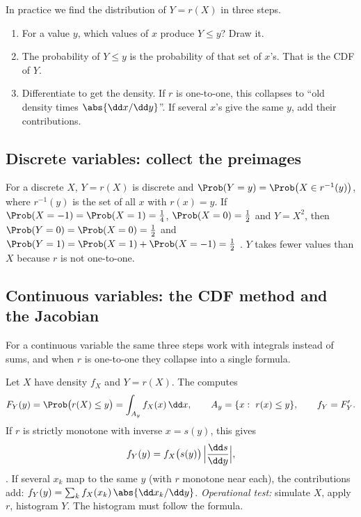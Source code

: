 In practice we find the distribution of $Y=r(X)$ in three steps.
\begin{enumerate}[leftmargin=1.5em,itemsep=1pt]
  \item For a value $y$, which values of $x$ produce $Y\le y$? Draw it.
  \item The probability of $Y\le y$ is the probability of that set of $x$'s.
        That is the CDF of $Y$.
  \item Differentiate to get the density. If $r$ is one-to-one, this collapses
        to ``old density times $\abs{\dd x/\dd y}$''. If several $x$'s give the
        same $y$, add their contributions.
\end{enumerate}

\subsection{Discrete variables: collect the preimages}

For a discrete $X$, $Y=r(X)$ is discrete and
$\Prob(Y=y)=\Prob\bigl(X\in r^{-1}(y)\bigr)$, where $r^{-1}(y)$ is the set of
all $x$ with $r(x)=y$. If $\Prob(X=-1)=\Prob(X=1)=\tfrac14$,
$\Prob(X=0)=\tfrac12$ and $Y=X^2$, then $\Prob(Y=0)=\Prob(X=0)=\tfrac12$ and
$\Prob(Y=1)=\Prob(X=1)+\Prob(X=-1)=\tfrac12$ . $Y$
takes fewer values than $X$ because $r$ is not one-to-one.

\subsection{Continuous variables: the CDF method and the Jacobian}

For a continuous variable the same three steps work with integrals instead of
sums, and when $r$ is one-to-one they collapse into a single formula.

\begin{workdef}
Let $X$ have density $f_X$ and $Y=r(X)$. The  computes
\[
  F_Y(y)=\Prob\bigl(r(X)\le y\bigr)=\int_{A_y}f_X(x)\,\dd x,\qquad
  A_y=\{x:\ r(x)\le y\},\qquad f_Y=F_Y' .
\]
If $r$ is strictly monotone with inverse $x=s(y)$, this gives
\begin{equation}
  f_Y(y)=f_X\bigl(s(y)\bigr)\,\Bigl\lvert\frac{\dd s}{\dd y}\Bigr\rvert ,
  \label{1b:eq:jacobian-1d}
\end{equation}
. If several $x_k$
map to the same $y$ (with $r$ monotone near each), the contributions add:
$f_Y(y)=\sum_kf_X(x_k)\,\abs{\dd x_k/\dd y}$.
\emph{Operational test:} simulate $X$, apply $r$, histogram $Y$. The
histogram must follow the formula.
\end{workdef}


